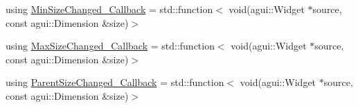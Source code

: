\begin{DoxyCompactItemize}
\item 
using \mbox{\hyperlink{classec_1_1_generic_widget_listener_a3a7f28218f30331b12bc00d05f4bc34f}{Min\+Size\+Changed\+\_\+\+Callback}} = std\+::function$<$ void(agui\+::\+Widget $\ast$source, const agui\+::\+Dimension \&size)$>$
\item 
using \mbox{\hyperlink{classec_1_1_generic_widget_listener_aa7b919052f00bb1241477c3681ddf06b}{Max\+Size\+Changed\+\_\+\+Callback}} = std\+::function$<$ void(agui\+::\+Widget $\ast$source, const agui\+::\+Dimension \&size)$>$
\item 
using \mbox{\hyperlink{classec_1_1_generic_widget_listener_acf92a781f3b2f06053cd1c100b6763d3}{Parent\+Size\+Changed\+\_\+\+Callback}} = std\+::function$<$ void(agui\+::\+Widget $\ast$source, const agui\+::\+Dimension \&size)$>$
\end{DoxyCompactItemize}
